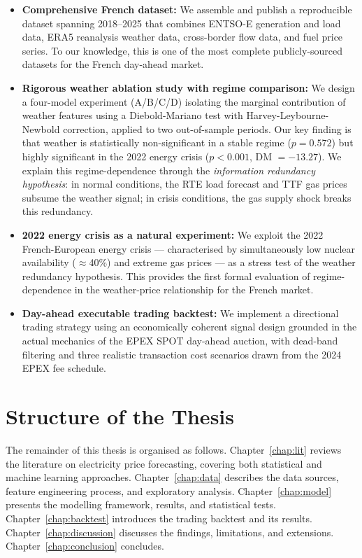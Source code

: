 \begin{itemize}
  \item \textbf{Comprehensive French dataset:} We assemble and publish a
  reproducible dataset spanning 2018--2025 that combines ENTSO-E generation
  and load data, ERA5 reanalysis weather data, cross-border flow data, and
  fuel price series. To our knowledge, this is one of the most complete
  publicly-sourced datasets for the French day-ahead market.

  \item \textbf{Rigorous weather ablation study with regime comparison:}
  We design a four-model experiment (A/B/C/D) isolating the marginal
  contribution of weather features using a Diebold-Mariano test with
  Harvey-Leybourne-Newbold correction, applied to two out-of-sample periods.
  Our key finding is that weather is statistically non-significant in a stable
  regime ($p = 0.572$) but highly significant in the 2022 energy crisis
  ($p < 0.001$, DM $= -13.27$). We explain this regime-dependence through
  the \textit{information redundancy hypothesis}: in normal conditions, the
  RTE load forecast and TTF gas prices subsume the weather signal; in crisis
  conditions, the gas supply shock breaks this redundancy.

  \item \textbf{2022 energy crisis as a natural experiment:} We exploit the
  2022 French-European energy crisis — characterised by simultaneously low
  nuclear availability ($\approx$40\%) and extreme gas prices — as a stress
  test of the weather redundancy hypothesis. This provides the first formal
  evaluation of regime-dependence in the weather-price relationship for the
  French market.

  \item \textbf{Day-ahead executable trading backtest:} We implement a
  directional trading strategy using an economically coherent signal design
  grounded in the actual mechanics of the EPEX SPOT day-ahead auction, with
  dead-band filtering and three realistic transaction cost scenarios drawn
  from the 2024 EPEX fee schedule.
\end{itemize}

\section{Structure of the Thesis}

The remainder of this thesis is organised as follows. Chapter~\ref{chap:lit} reviews the literature on electricity price forecasting, covering both statistical and machine learning approaches. Chapter~\ref{chap:data} describes the data sources, feature engineering process, and exploratory analysis. Chapter~\ref{chap:model} presents the modelling framework, results, and statistical tests. Chapter~\ref{chap:backtest} introduces the trading backtest and its results. Chapter~\ref{chap:discussion} discusses the findings, limitations, and extensions. Chapter~\ref{chap:conclusion} concludes.

